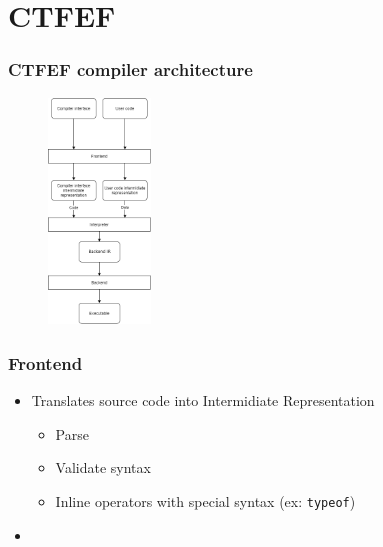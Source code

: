 \section{CTFEF}

\begin{frame}
    \frametitle{CTFEF compiler architecture}
    \begin{figure}
        
        \begin{center}
            \includegraphics[height=6cm]{pictures/compiler-structure.png}
        \end{center}
    \end{figure}

\end{frame}


\begin{frame}
    \frametitle{Frontend}

    \begin{itemize}
        \item Translates source code into Intermidiate Representation\begin{itemize}
            \item Parse
            \item Validate syntax
            \item Inline operators with special syntax (ex: \lstinline|typeof|)
        \end{itemize}
        \item 
    \end{itemize}

\end{frame}